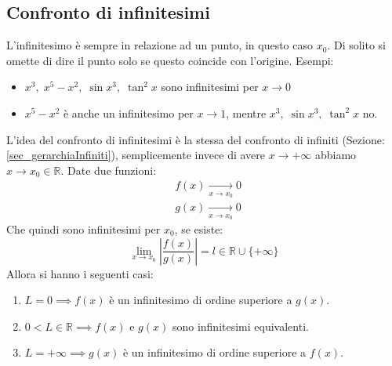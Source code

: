 \subsection{Confronto di infinitesimi}
L'infinitesimo è sempre in relazione ad un punto, in questo caso $x_0$. Di 
solito si omette di dire il punto solo se questo coincide con l'origine. 
Esempi:
\begin{itemize}
	\item $x^3,\; x^5 - x^2,\; \sin{x^3},\; \tan^2{x}$ sono infinitesimi per 
        $x \to 0$
	
	\item $x^5 - x^2$ è anche un infinitesimo per $x \to 1$, mentre $x^3,\; 
        \sin{x^3},\; \tan^2{x}$ no.
\end{itemize}

L'idea del confronto di infinitesimi è la stessa del confronto di infiniti 
(Sezione: \ref{sec_gerarchiaInfiniti}), semplicemente invece di avere $x \to 
+\infty$ abbiamo $x \to x_0 \in \mathbb{R}$. Date due funzioni:
\begin{align*}
	&f(x) \xrightarrow[x \to x_0]{} 0\\
	&g(x) \xrightarrow[x \to x_0]{} 0
\end{align*}
Che quindi sono infinitesimi per $x_0$, se esiste:
\begin{equation*}
	\lim_{x \to x_0} \left| \dfrac{f(x)}{g(x)} \right| = l \in \mathbb{R} \cup 
    \{+\infty\}
\end{equation*}
Allora si hanno i seguenti casi:
\begin{enumerate}
	\item $L = 0 \implies f(x)$ è un infinitesimo di ordine superiore a $g(x)$.

	\item $0 < L \in \mathbb{R} \implies f(x)$ e $g(x)$ sono infinitesimi 
        equivalenti.

	\item $L = +\infty \implies g(x)$ è un infinitesimo di ordine superiore a 
        $f(x)$.
\end{enumerate}

